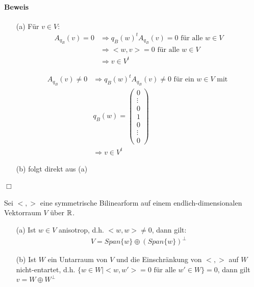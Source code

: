 \paragraph{Beweis}
\begin{itemize}
\item[(a)] Für $v \in V$:
\begin{align}
A_{q_B}(v) = 0 &\Rightarrow q_B(w)^t A_{q_B}(v) = 0 \text{ für alle } w \in V \\
&\Rightarrow <w, v> = 0 \text{ für alle } w \in V\\
&\Rightarrow v \in V^{t}
\end{align}

\begin{align}
A_{q_B}(v) \neq 0 &\Rightarrow q_B(w)^t A_{q_B}(v) \neq 0 \text{ für ein } w \in V \text{ mit } \\
&q_B(w) = \begin{pmatrix} 0 \\ \vdots \\ 0 \\ 1 \\ 0 \\ \vdots \\ 0 \end{pmatrix} \\
&\Rightarrow v \in V^{t}
\end{align}
\item[(b)] folgt direkt aus (a)
\end{itemize}
\hspace{1cm} \hfill $\Box$ \\

\begin{lemma} %
\label{lemma524}
Sei $<, >$ eine symmetrische Bilinearform auf einem endlich-dimensionalen Vektorraum $V$ über $\mathbb{R}$.
\begin{itemize}
\item[(a)] Ist $w \in V$ anisotrop, d.h. $<w, w> \neq 0$, dann gilt:
\begin{align}
V = Span\{w\} \oplus (Span\{w\})^{\perp}
\end{align}
\item[(b)] Ist $W$ ein Untarraum von $V$ und die Einschränkung von $<, >$ auf $W$ nicht-entartet, d.h. $\{w \in W | <w, w'> = 0 \text{ für alle } w' \in W\} = 0$, dann gilt $v = W \oplus W^{\perp}$
\end{itemize}
\end{lemma}

